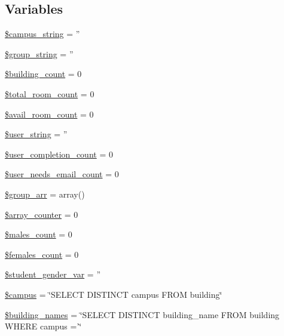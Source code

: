 \subsection*{\-Variables}
\begin{DoxyCompactItemize}
\item 
\hyperlink{admin__view_2index_8php_a9cbaf35082f8edc5439404467c593e5a}{\$campus\-\_\-string} = ''
\item 
\hyperlink{admin__view_2index_8php_a9f3ee723b1a892569e6de7af06e4e7b5}{\$group\-\_\-string} = ''
\item 
\hyperlink{admin__view_2index_8php_abcc551d7bb78645ca485dd1332f3637a}{\$building\-\_\-count} = 0
\item 
\hyperlink{admin__view_2index_8php_afa16349167e96ad1b72ad891ac3d0b07}{\$total\-\_\-room\-\_\-count} = 0
\item 
\hyperlink{admin__view_2index_8php_a02eb1848bf44216bfff32490e891d18a}{\$avail\-\_\-room\-\_\-count} = 0
\item 
\hyperlink{admin__view_2index_8php_af990a6460b9371f7ac0a860c265c47d9}{\$user\-\_\-string} = ''
\item 
\hyperlink{admin__view_2index_8php_a80ebec900a7702cc0c8558ce53366963}{\$user\-\_\-completion\-\_\-count} = 0
\item 
\hyperlink{admin__view_2index_8php_a33eb6cef4540fcb421e0cd11335798a3}{\$user\-\_\-needs\-\_\-email\-\_\-count} = 0
\item 
\hyperlink{admin__view_2index_8php_aacdcd61fee4523e3e12b143603e10590}{\$group\-\_\-arr} = array()
\item 
\hyperlink{admin__view_2index_8php_a23bfd2b4e40b92a4e1df61a3752528d5}{\$array\-\_\-counter} = 0
\item 
\hyperlink{admin__view_2index_8php_a8d7947787809be82314a3f1843adb460}{\$males\-\_\-count} = 0
\item 
\hyperlink{admin__view_2index_8php_a6b8782dbe4c91ae2ca45031af651d818}{\$females\-\_\-count} = 0
\item 
\hyperlink{admin__view_2index_8php_a8c73c9da0db2b0c0fa8d07057849a37e}{\$student\-\_\-gender\-\_\-var} = ''
\item 
\hyperlink{admin__view_2index_8php_a6f0655994f3941d6ab50f681032f899b}{\$campus} = \char`\"{}\-S\-E\-L\-E\-C\-T \-D\-I\-S\-T\-I\-N\-C\-T campus \-F\-R\-O\-M building\char`\"{}
\item 
\hyperlink{admin__view_2index_8php_a8ab55fcf525cc50064165d5b3e77e9a5}{\$building\-\_\-names} = \char`\"{}\-S\-E\-L\-E\-C\-T \-D\-I\-S\-T\-I\-N\-C\-T building\-\_\-name \-F\-R\-O\-M building \-W\-H\-E\-R\-E campus ='\char`\"{}

\end{DoxyCompactItemize}
